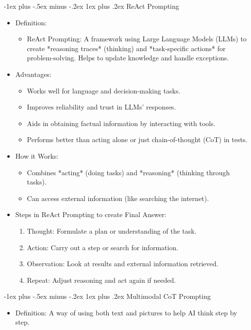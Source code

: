 \documentclass[10pt,landscape]{article}
\makeatletter
\renewcommand{\subsection}{\@startsection{subsection}{2}{0mm}%
                                {-1explus -.5ex minus -.2ex}%
                                {0.5ex plus .2ex}%
                                {\normalfont\normalsize\bfseries}}
\renewcommand{\subsection}{\@startsection{subsection}{3}{0mm}%
                                {-1ex plus -.5ex minus -.2ex}%
                                {1ex plus .2ex}%
                                {\normalfont\small\bfseries}}
\makeatother
\begin{document}
\begin{multicols}{3}
\subsection{ReAct Prompting}
\begin{itemize}
    \item Definition:
    \begin{itemize}
        \item ReAct Prompting: A framework using Large Language Models (LLMs) to create *reasoning traces* (thinking) and *task-specific actions* for problem-solving. Helps to update knowledge and handle exceptions.
    \end{itemize}
    \item Advantages:
    \begin{itemize}
        \item Works well for language and decision-making tasks.
        \item Improves reliability and trust in LLMs' responses.
        \item Aids in obtaining factual information by interacting with tools.
        \item Performs better than acting alone or just chain-of-thought (CoT) in tests.
    \end{itemize}
    \item How it Works:
    \begin{itemize}
        \item Combines *acting* (doing tasks) and *reasoning* (thinking through tasks).
        \item Can access external information (like searching the internet).
    \end{itemize}
    \item Steps in ReAct Prompting to create Final Answer:
    \begin{enumerate}
        \item Thought: Formulate a plan or understanding of the task.
        \item Action: Carry out a step or search for information.
        \item Observation: Look at results and external information retrieved.
        \item Repeat: Adjust reasoning and act again if needed.
    \end{enumerate}
\end{itemize}

\subsection{Multimodal CoT Prompting}
\begin{itemize}
    \item Definition: A way of using both text and pictures to help AI think step by step.
\end{itemize}
\end{multicols}
\end{document}

